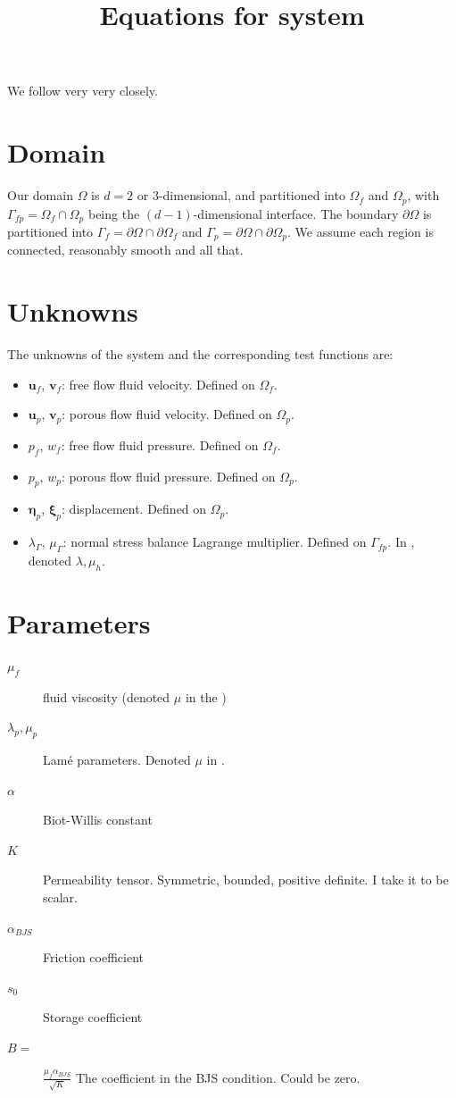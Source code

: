 \documentclass{article}
\newcommand{\mathspace}[1]{\ensuremath{#1}\xspace} %
\newcommand{\stokes}{\mathspace{\Omega_{f}}}
\newcommand{\stokesbdy}{\mathspace{\Gamma_{f}}}
\newcommand{\darcy}{\mathspace{\Omega_{p}}}
\newcommand{\darcybdy}{\mathspace{\Gamma_{p}}}
\newcommand{\interface}{\mathspace{\Gamma_{fp}}}
\newcommand{\uf}{\mathspace{\mathbf{u}_f}}
\newcommand{\vf}{\mathspace{\mathbf{v}_f}}
\newcommand{\up}{\mathspace{\mathbf{u}_p}}
\newcommand{\vp}{\mathspace{\mathbf{v}_p}}
\newcommand{\pf}{\mathspace{p_f}}
\newcommand{\pp}{\mathspace{p_p}}
\newcommand{\wf}{\mathspace{w_f}}
\renewcommand{\wp}{\mathspace{w_p}}
\newcommand{\disp}{\mathspace{\boldsymbol{\eta}_p}}
\newcommand{\disptest}{\mathspace{\boldsymbol{\xi}_p}}
\newcommand{\mult}{\mathspace{\lambda_{\Gamma}}}
\newcommand{\multtest}{\mathspace{\mu_{\Gamma}}}
\begin{document}
\title{Equations for system}
\maketitle


We follow \cite{ambartsumyan} very very closely.

\section{Domain}
Our domain $\Omega$ is $d=2 \text{ or } 3$-dimensional, and partitioned into \stokes and \darcy, with $\interface = \stokes \cap \darcy$ being the $(d-1)$-dimensional interface. The boundary $\partial \Omega$ is partitioned into $\stokesbdy = \partial \Omega \cap \partial \stokes$ and $\darcybdy = \partial \Omega \cap \partial \darcy$. We assume each region is connected, reasonably smooth and all that.

\section{Unknowns}
The unknowns of the system and the corresponding test functions are:

\begin{itemize}
\item \uf, \vf : free flow fluid velocity. Defined on \stokes.
\item \up, \vp : porous flow fluid velocity. Defined on \darcy.
\item \pf, \wf : free flow fluid pressure. Defined on \stokes.
\item \pp, \wp : porous flow fluid pressure. Defined on \darcy.
\item \disp, \disptest : displacement. Defined on \darcy.
\item \mult, \multtest : normal stress balance Lagrange multiplier. Defined on \interface. In \cite{ambartsumyan}, denoted $\lambda, \mu_h$.

\end{itemize}

\section{Parameters}

\begin{description}
\item[$\mu_f$] fluid viscosity (denoted $\mu$ in the \cite{ambartsumyan})
  
\item[$\lambda_p, \mu_p$] Lamé parameters. Denoted $\mu$ in \cite{ambartsumyan}.
\item[$\alpha$] Biot-Willis constant
\item[$K$] Permeability tensor. Symmetric, bounded, positive definite. I take it to be scalar.
\item[$\alpha_{BJS}$] Friction coefficient
\item[$s_0$] Storage coefficient
\item[$B=$] $\frac {\mu_f \alpha_{BJS}} {\sqrt{K}}$ The coefficient in the BJS condition. Could be zero.
\end{description}
\end{document}
